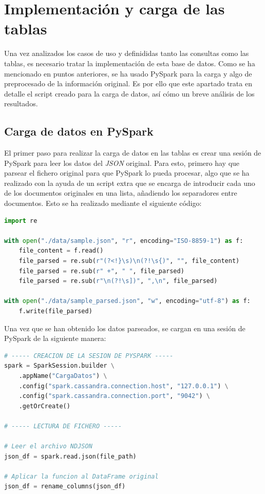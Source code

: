 \documentclass[]{article}
\begin{document}
\newpage
\section{Implementación y carga de las tablas}
\label{sec:implementacion}
Una vez analizados los casos de uso y definididas tanto las consultas como las tablas, es necesario tratar la implementación de esta base de datos. Como se ha mencionado en puntos anteriores, se ha usado PySpark para la carga y algo de preprocesado de la información original. Es por ello que este apartado trata en detalle el script creado para la carga de datos, así cómo un breve análisis de los resultados.

\subsection{Carga de datos en PySpark}
El primer paso para realizar la carga de datos en las tablas es crear una sesión de PySpark para leer los datos del \textit{JSON} original. Para esto, primero hay que parsear el fichero original para que PySpark lo pueda procesar, algo que se ha realizado con la ayuda de un script extra que se encarga de introducir cada uno de los documentos originales en una lista, añadiendo los separadores entre documentos. Esto se ha realizado mediante el siguiente código:

\lstset{style=python}
\begin{lstlisting}[language=python, caption=Parseo del JSON original]
import re

with open("./data/sample.json", "r", encoding="ISO-8859-1") as f:
    file_content = f.read()
    file_parsed = re.sub(r"(?<!}\s)\n(?!\s{)", "", file_content)
    file_parsed = re.sub(r" +", " ", file_parsed)
    file_parsed = re.sub(r"\n(?!\s])", ",\n", file_parsed)

with open("./data/sample_parsed.json", "w", encoding="utf-8") as f:
    f.write(file_parsed)
\end{lstlisting}

Una vez que se han obtenido los datos parseados, se cargan en una sesión de PySpark de la siguiente manera:

\begin{lstlisting}[language=python, caption=Carga de datos en PySpark]
# ----- CREACION DE LA SESION DE PYSPARK -----
spark = SparkSession.builder \
    .appName("CargaDatos") \
    .config("spark.cassandra.connection.host", "127.0.0.1") \
    .config("spark.cassandra.connection.port", "9042") \
    .getOrCreate()

# ----- LECTURA DE FICHERO -----

# Leer el archivo NDJSON
json_df = spark.read.json(file_path)

# Aplicar la funcion al DataFrame original
json_df = rename_columns(json_df)
\end{lstlisting}
\end{document}
